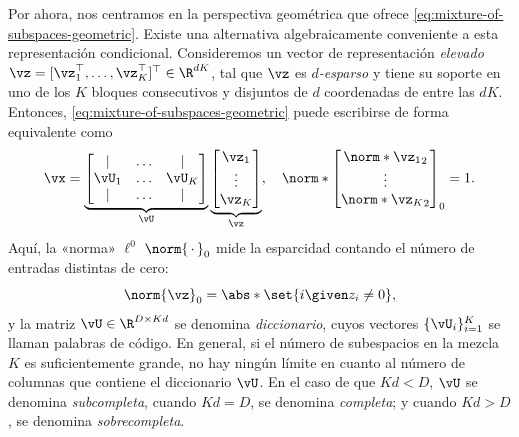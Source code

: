 \documentclass[../../book-main.tex]{subfiles}
\begin{document}
Por ahora, nos centramos en la perspectiva geométrica que ofrece
\eqref{eq:mixture-of-subspaces-geometric}.
Existe una alternativa algebraicamente conveniente a esta
representación condicional. Consideremos un vector de representación \textit{elevado} $\vz
= [\vz_1^\top, \dots, \vz_K^\top]^\top \in \R^{dK}$, tal que $\vz$
es \textit{$d$-esparso} y tiene su soporte en uno de los $K$ bloques consecutivos
y disjuntos de $d$ coordenadas de entre las $dK$. Entonces, 
\eqref{eq:mixture-of-subspaces-geometric} puede escribirse de forma equivalente como
\begin{equation}\label{eq:mixture-of-subspaces-dictionary-pre}
    \vx =
    \underbrace{
        \begin{bmatrix}
            | & \dots & |  \\
            \vU_1 & \dots & \vU_K  \\
            | & \dots & |
        \end{bmatrix}
    }_{\vU}
    \underbrace{
        \begin{bmatrix} \vz_1 \\ \vdots \\ \vz_K
        \end{bmatrix}
    }_{\vz},
    \quad
    \norm*{
        \begin{bmatrix} \norm*{\vz_1}_2 \\ \vdots \\ \norm*{\vz_K}_2
        \end{bmatrix}
    }_0 = 1.
\end{equation}
Aquí, la «norma» $\ell^0$ $\norm{\,\cdot\,}_0$ mide la esparcidad
contando el número de entradas distintas de cero:
\begin{equation}\label{eq:ell-zero-norm}
    \norm{\vz}_0 = \abs*{\set{i \given z_i \neq 0}},
\end{equation}
y la matriz $\vU \in \R^{D \times Kd}$ se denomina \textit{diccionario}, 
cuyos vectores $\{\vU_i\}_{i=1}^K$ se llaman palabras de código.
En general, si el número de subespacios en la mezcla $K$ es suficientemente
grande, no hay ningún límite en cuanto al número de columnas que contiene el
diccionario $\vU$. En el caso de que $Kd < D$, $\vU$ se denomina
\textit{subcompleta}, cuando $Kd = D$, se denomina \textit{completa}; y cuando $Kd > D$,
se denomina \textit{sobrecompleta}.
\end{document}
